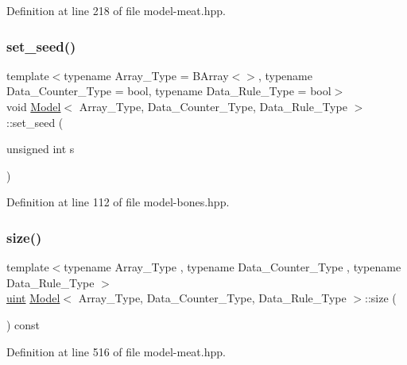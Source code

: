 Definition at line 218 of file model-\/meat.\+hpp.

\mbox{\label{class_model_a5baf09853382529460889f15076bc64a}} 
\subsubsection{\texorpdfstring{set\+\_\+seed()}{set\_seed()}}
{\footnotesize\ttfamily template$<$typename Array\+\_\+\+Type = B\+Array$<$$>$, typename Data\+\_\+\+Counter\+\_\+\+Type = bool, typename Data\+\_\+\+Rule\+\_\+\+Type = bool$>$ \\
void \hyperlink{class_model}{Model}$<$ Array\+\_\+\+Type, Data\+\_\+\+Counter\+\_\+\+Type, Data\+\_\+\+Rule\+\_\+\+Type $>$\+::set\+\_\+seed (\begin{DoxyParamCaption}\item[{unsigned int}]{s }\end{DoxyParamCaption})\hspace{0.3cm}{\ttfamily [inline]}}



Definition at line 112 of file model-\/bones.\+hpp.

\mbox{\label{class_model_ab3f157dbb542a48fe5bf412ff7d467fd}} 
\subsubsection{\texorpdfstring{size()}{size()}}
{\footnotesize\ttfamily template$<$typename Array\+\_\+\+Type , typename Data\+\_\+\+Counter\+\_\+\+Type , typename Data\+\_\+\+Rule\+\_\+\+Type $>$ \\
\hyperlink{typedefs_8hpp_a91ad9478d81a7aaf2593e8d9c3d06a14}{uint} \hyperlink{class_model}{Model}$<$ Array\+\_\+\+Type, Data\+\_\+\+Counter\+\_\+\+Type, Data\+\_\+\+Rule\+\_\+\+Type $>$\+::size (\begin{DoxyParamCaption}{ }\end{DoxyParamCaption}) const\hspace{0.3cm}{\ttfamily [inline]}}



Definition at line 516 of file model-\/meat.\+hpp.

\mbox{\label{class_model_a4b5edbe891b6da2319ea3fa6f1aba11d}} 
